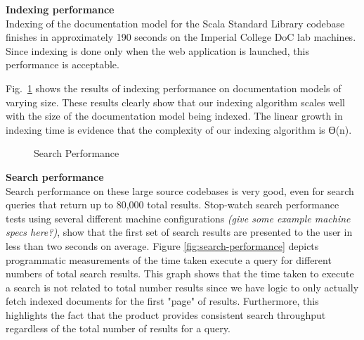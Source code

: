 \textbf{Indexing performance}\\
Indexing of the documentation model for the Scala Standard Library codebase finishes in approximately 190 seconds on the Imperial College DoC lab machines. Since indexing is done only when the web application is launched, this performance is acceptable.

Fig.~\ref{fig:indexing-performance}  shows the results of indexing performance on documentation models of varying size. These results clearly show that our indexing algorithm scales well with the size of the documentation model being indexed. The linear growth in indexing time is evidence that the complexity of our indexing algorithm is ϴ(n).

\begin{figure}[h!t]
\begin{center}
\leavevmode
{}
\end{center}
\caption{Search Performance}
\label{fig:indexing-performance}
\end{figure}

\textbf{Search performance}\\
Search performance on these large source codebases is very good, even for search queries that return up to 80,000 total results. Stop-watch search performance tests using several different machine configurations \emph{\color{red}(give some example machine specs here?)}, show that the first set of search results are presented to the user in less than two seconds on average. Figure \ref{fig:search-performance} depicts programmatic measurements of the time taken execute a query for different numbers of total search results. This graph shows that the time taken to execute a search is not related to total number results since we have logic to only actually fetch indexed documents for the first "page" of results. Furthermore, this highlights the fact that the product provides consistent search throughput regardless of the total number of results for a query.



